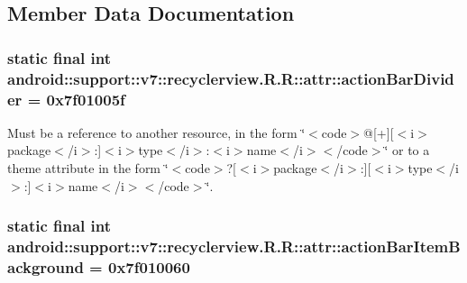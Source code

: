 \subsection{Member Data Documentation}
\hypertarget{classandroid_1_1support_1_1v7_1_1recyclerview_1_1_r_1_1attr_149527b51d5ba177533c5cbede5ad832}{
\subsubsection[{actionBarDivider}]{\setlength{\rightskip}{0pt plus 5cm}static final int android::support::v7::recyclerview.R.R::attr::actionBarDivider = 0x7f01005f}}
\label{classandroid_1_1support_1_1v7_1_1recyclerview_1_1_r_1_1attr_149527b51d5ba177533c5cbede5ad832}


Must be a reference to another resource, in the form \char`\"{}$<$code$>$@\mbox{[}+\mbox{]}\mbox{[}$<$i$>$package$<$/i$>$:\mbox{]}$<$i$>$type$<$/i$>$:$<$i$>$name$<$/i$>$$<$/code$>$\char`\"{} or to a theme attribute in the form \char`\"{}$<$code$>$?\mbox{[}$<$i$>$package$<$/i$>$:\mbox{]}\mbox{[}$<$i$>$type$<$/i$>$:\mbox{]}$<$i$>$name$<$/i$>$$<$/code$>$\char`\"{}. \hypertarget{classandroid_1_1support_1_1v7_1_1recyclerview_1_1_r_1_1attr_90ccaf7c1a106421aefd14f90295f8bb}{
\subsubsection[{actionBarItemBackground}]{\setlength{\rightskip}{0pt plus 5cm}static final int android::support::v7::recyclerview.R.R::attr::actionBarItemBackground = 0x7f010060}}
\label{classandroid_1_1support_1_1v7_1_1recyclerview_1_1_r_1_1attr_90ccaf7c1a106421aefd14f90295f8bb}


